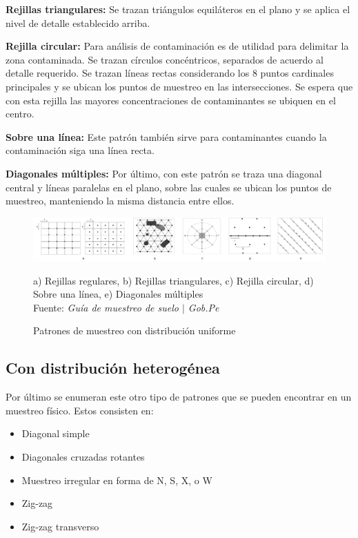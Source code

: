 \documentclass{report}
\begin{document}
\bigbreak

\textbf{Rejillas triangulares:} Se trazan triángulos equiláteros en el plano y se aplica el nivel de detalle establecido arriba.

\bigbreak

\textbf{Rejilla circular:} Para análisis de contaminación es de utilidad para delimitar la zona contaminada. Se trazan círculos concéntricos, separados de acuerdo al detalle requerido. Se trazan líneas rectas considerando los 8 puntos cardinales principales y se ubican los puntos de muestreo en las intersecciones. Se espera que con esta rejilla las mayores concentraciones de contaminantes se ubiquen en el centro.

\bigbreak

\textbf{Sobre una línea:} Este patrón también sirve para contaminantes cuando la contaminación siga una línea recta.

\bigbreak

\textbf{Diagonales múltiples:} Por último, con este patrón se traza una diagonal central y líneas paralelas en el plano, sobre las cuales se ubican los puntos de muestreo, manteniendo la misma distancia entre ellos.

\begin{figure}[H]
    \centering
    \includegraphics[width=0.7\paperwidth]{ref/uniform-sampling-patterns.png}
    \caption{Patrones de muestreo con distribución uniforme}
    a) Rejillas regulares, b) Rejillas triangulares, c) Rejilla circular, d) Sobre una línea, e) Diagonales múltiples \\
    Fuente: \textit{Guía de muestreo de suelo $\mid$ Gob.Pe} \cite{gobpe-ministerio-del-ambiente-2014}
\end{figure}


\subsection{Con distribución heterogénea}

Por último se enumeran este otro tipo de patrones que se pueden encontrar en un muestreo físico. Estos consisten en:

\begin{itemize}
    \item Diagonal simple
    \item Diagonales cruzadas rotantes
    \item Muestreo irregular en forma de N, S, X, o W
    \item Zig-zag
    \item Zig-zag transverso
\end{itemize}
\end{document}
